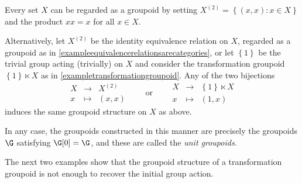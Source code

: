 \begin{example}\label{exampleunitgroupoid}
Every set $X$ can be regarded as a groupoid by setting $X^{(2)}=\left\{(x,x):x\in X\right\}$ and the product $xx=x$ for all $x\in X$.

Alternatively, let $X^{(2)}$ be the identity equivalence relation on $X$, regarded as a groupoid as in \ref{exampleequivalencerelationsarecategories}, or let $\left\{1\right\}$ be the trivial group acting (trivially) on $X$ and consider the transformation groupoid $\left\{1\right\}\ltimes X$ as in \ref{exampletransformationgroupoid}. Any of the two bijections
\[\begin{array}{rcl}
X&\longrightarrow&X^{(2)}\\
x&\longmapsto&(x,x)
\end{array}\qquad\text{or}\qquad\begin{array}{rcl}
X&\longrightarrow&\left\{1\right\}\ltimes X\\
x&\longmapsto&(1,x)
\end{array}
\]
induces the same groupoid structure on $X$ as above.

In any case, the groupoids constructed in this manner are precisely the groupoids $\G$ satisfying $\G[0]=\G$, and these are called the \emph{unit groupoids}.
\end{example}

The next two examples show that the groupoid structure of a transformation groupoid is not enough to recover the initial group action.

